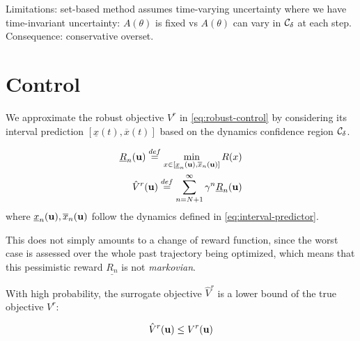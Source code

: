 \documentclass{article}
\begin{document}

Limitations: set-based method assumes time-varying uncertainty where we have time-invariant uncertainty: $A(\theta)$ is fixed vs $A(\theta)$ can vary in $\mathcal{C}_\delta$ at each step. Consequence: conservative overset.

\section{Control}

\label{sec:control}
We approximate the robust objective $V^r$ in \eqref{eq:robust-control} by considering its interval prediction $[\underline{x}(t), \overline{x}(t)]$ based on the dynamics confidence region $\mathcal{C}_\delta$.

\begin{definition}
\begin{align}
\underline{R}_n(\mathbf{u}) \stackrel{def}{=} \min_{x\in[\underline{x}_n(\mathbf{u}), \overline{x}_n(\mathbf{u})]}  R(x) \label{eq:pessimistic-rewards} \\
\hat{V}^r(\mathbf{u}) \stackrel{def}{=} \sum_{n=N+1}^\infty \gamma^n \underline{R}_n(\mathbf{u}) \label{eq:surrogate_objective}
\end{align}
where $\underline{x}_n(\mathbf{u}), \overline{x}_n(\mathbf{u})$ follow the dynamics defined in \eqref{eq:interval-predictor}.
\end{definition}

This does not simply amounts to a change of reward function, since the worst case is assessed over the whole past trajectory being optimized, which means that this pessimistic reward $\underline{R_n}$ is not \emph{markovian}.

\begin{proposition}
\label{prop:lower-bound}
With high probability, the surrogate objective $\hat{V}^r$ is a lower bound of the true objective $V^r$:

\begin{equation}
\hat{V}^r(\mathbf{u}) \leq V^r(\mathbf{u})
\end{equation}
\end{proposition}
\end{document}
